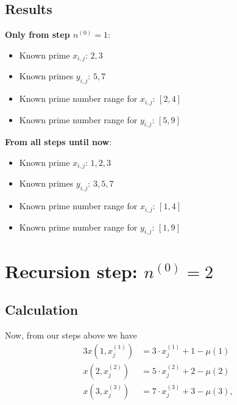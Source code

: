 \subsection{Results}
\label{ss:resultsstepn0_1}
\textbf{Only from step $n^{\left(0\right)} = 1$}:
\begin{itemize}
	\item Known prime $x_{i,j}$: $2,3$
	\item Known primes $y_{i,j}$: $5,7$
	\item Known prime number range for $x_{i,j}$: $[2,4]$
	\item Known prime number range for $y_{i,j}$: $[5,9]$
\end{itemize}

\textbf{From all steps until now}:
\begin{itemize}
	\item Known prime $x_{i,j}$: $1,2,3$
	\item Known primes $y_{i,j}$: $3,5,7$
	\item Known prime number range for $x_{i,j}$: $[1,4]$
	\item Known prime number range for $y_{i,j}$: $[1,9]$
\end{itemize}

\section{Recursion step: $n^{\left(0\right)} = 2$}
\label{s:recursionstepn0_2}
\subsection{Calculation}
\label{ss:calcualtionstepn0_2}
Now, from our steps above we have 
\begin{alignat}{3}
	x\left(1,x_{j}^{\left(1\right)}\right) &= 3\cdot x_{j}^{\left(1\right)} + 1 - \mu\left(1\right) \label{eq:stepn0_2_eq3} \\
	x\left(2,x_{j}^{\left(2\right)}\right) &= 5\cdot x_{j}^{\left(2\right)} + 2 - \mu\left(2\right) \label{eq:stepn0_2_eq5} \\
	x\left(3,x_{j}^{\left(3\right)}\right) &= 7\cdot x_{j}^{\left(3\right)} + 3 - \mu\left(3\right), \label{eq:stepn0_2_eq7}
\end{alignat} 

